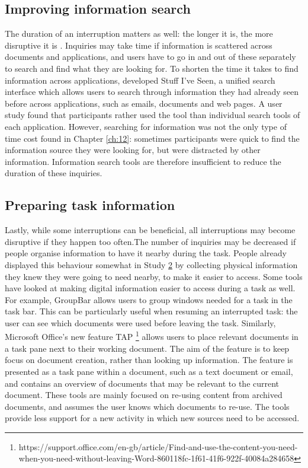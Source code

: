 \subsection{Improving information search}
The duration of an interruption matters as well: the longer it is, the more disruptive it is \citep{Altmann2017, Monk2008}. Inquiries may take time  if information is scattered across documents and applications, and users have to go in and out of these separately to search and find what they are looking for. To shorten the time it takes to find information across applications, \citet{Dumais2003} developed Stuff I’ve Seen, a unified search interface which allows users to search through information they had already seen before across applications, such as emails, documents and web pages. A user study found that participants rather used the tool than individual search tools of each application. However, searching for information was not the only type of time cost found in Chapter \ref{ch:12}: sometimes participants were quick to find the information source they were looking for, but were distracted by other information. Information search tools are therefore insufficient to reduce the duration of these inquiries. 

\subsection{Preparing task information}
Lastly, while some interruptions can be beneficial, all interruptions may become disruptive if they happen too often.The number of inquiries may be decreased if people organise information to have it nearby during the task. People already displayed this behaviour somewhat in Study \hyperref[st:Study2]{2} by collecting physical information they knew they were going to need nearby, to make it easier to access. Some tools have looked at making digital information easier to access during a task as well. For example, GroupBar \citet{Smith2003} allows users to group windows needed for a task in the task bar. This can be particularly useful when resuming an interrupted task: the user can see which documents were used before leaving the task. Similarly, Microsoft Office’s new feature TAP \footnote{https://support.office.com/en-gb/article/Find-and-use-the-content-you-need-when-you-need-without-leaving-Word-860118fc-1f61-41f6-922f-40084a284658} allows users to place relevant documents in a task pane next to their working document. The aim of the feature is to keep focus on document creation, rather than looking up information. The feature is presented as a task pane within a document, such as a text document or email, and contains an overview of documents that may be relevant to the current document. These tools are mainly focused on re-using content from archived documents, and assumes the user knows which documents to re-use. The tools provide less support for a new activity in which new sources need to be accessed. 

